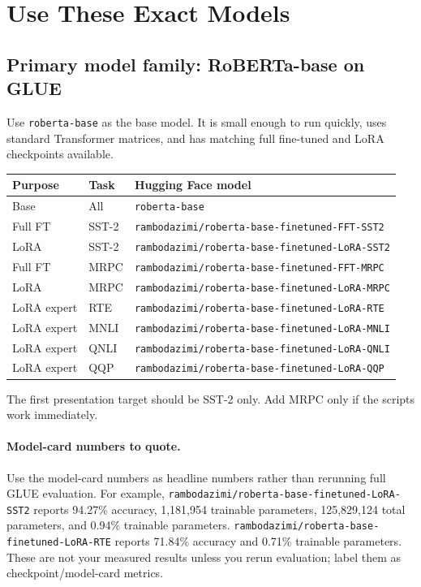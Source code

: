 \documentclass[11pt]{article}
\begin{document}
\section{Use These Exact Models}

\subsection{Primary model family: RoBERTa-base on GLUE}

Use \texttt{roberta-base} as the base model. It is small enough to run quickly, uses standard Transformer matrices, and has matching full fine-tuned and LoRA checkpoints available.

\begin{center}
\begin{tabular}{@{}lll@{}}
\toprule
Purpose & Task & Hugging Face model \\
\midrule
Base & All & \texttt{roberta-base} \\
Full FT & SST-2 & \texttt{rambodazimi/roberta-base-finetuned-FFT-SST2} \\
LoRA & SST-2 & \texttt{rambodazimi/roberta-base-finetuned-LoRA-SST2} \\
Full FT & MRPC & \texttt{rambodazimi/roberta-base-finetuned-FFT-MRPC} \\
LoRA & MRPC & \texttt{rambodazimi/roberta-base-finetuned-LoRA-MRPC} \\
LoRA expert & RTE & \texttt{rambodazimi/roberta-base-finetuned-LoRA-RTE} \\
LoRA expert & MNLI & \texttt{rambodazimi/roberta-base-finetuned-LoRA-MNLI} \\
LoRA expert & QNLI & \texttt{rambodazimi/roberta-base-finetuned-LoRA-QNLI} \\
LoRA expert & QQP & \texttt{rambodazimi/roberta-base-finetuned-LoRA-QQP} \\
\bottomrule
\end{tabular}
\end{center}

The first presentation target should be SST-2 only. Add MRPC only if the scripts work immediately.

\paragraph{Model-card numbers to quote.}
Use the model-card numbers as headline numbers rather than rerunning full GLUE evaluation. For example, \texttt{rambodazimi/roberta-base-finetuned-LoRA-SST2} reports 94.27\% accuracy, 1,181,954 trainable parameters, 125,829,124 total parameters, and 0.94\% trainable parameters. \texttt{rambodazimi/roberta-base-finetuned-LoRA-RTE} reports 71.84\% accuracy and 0.71\% trainable parameters. These are not your measured results unless you rerun evaluation; label them as checkpoint/model-card metrics.
\end{document}
